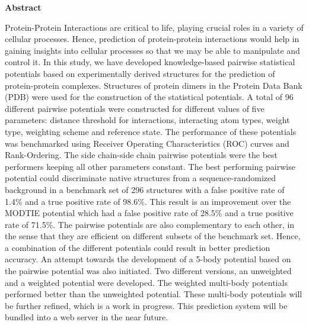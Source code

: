 \begin{titlepage}
\begin{center}
{\huge \bfseries Abstract}\\[1.5cm]
\end{center}
Protein-Protein Interactions are critical to life, playing crucial roles in a variety of cellular processes. Hence, prediction of protein-protein interactions would help in gaining insights into cellular processes so that we may be able to manipulate and control it. In this study, we have developed knowledge-based pairwise statistical potentials based on experimentally derived structures for the prediction of protein-protein complexes. Structures of protein dimers in the Protein Data Bank (PDB) were used for the construction of the statistical potentials. A total of 96 different pairwise potentials were constructed for different values of five parameters: distance threshold for interactions, interacting atom types, weight type, weighting scheme and reference state. The performance of these potentials was benchmarked using Receiver Operating Characteristics (ROC) curves and Rank-Ordering. The side chain-side chain pairwise potentials were the best performers keeping all other parameters constant. The best performing pairwise potential could discriminate native structures from a sequence-randomized background in a benchmark set of 296 structures with a false positive rate of 1.4\% and a true positive rate of 98.6\%. This result is an improvement over the MODTIE potential which had a false positive rate of 28.5\% and a true positive rate of 71.5\%. The pairwise potentials are also complementary to each other, in the sense that they are efficient on different subsets of the benchmark set. Hence, a combination of the different potentials could result in better prediction accuracy. An attempt towards the development of a 5-body potential based on the pairwise potential was also initiated. Two different versions, an unweighted and a weighted potential were developed. The weighted multi-body potentials performed better than the unweighted potential. These multi-body potentials will be further refined, which is a work in progress. This prediction system will be bundled into a web server in the near future.

\vfill %
\end{titlepage}
